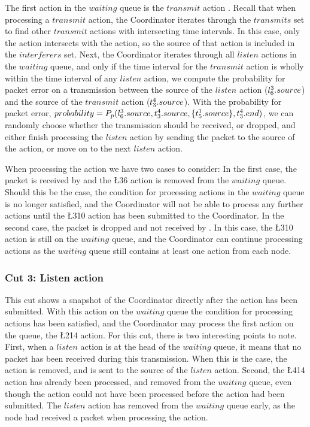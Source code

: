 
The first action in the $waiting$ queue is the $transmit$ action . Recall that when processing a $transmit$ action, the Coordinator iterates through the $transmits$ set to find other $transmit$ actions with intersecting time intervals. In this case, only the  action intersects with the  action, so the source of that action is included in the $interferers$ set. Next, the Coordinator iterates through all $listen$ actions in the $waiting$ queue, and only if the time interval for the $transmit$ action is wholly within the time interval of any $listen$ action, we compute the probability for packet error on a transmission between the source of the $listen$ action ($l^{3}_{6}.source$) and the source of the $transmit$ action ($t^{4}_{3}.source$). With the probability for packet error, $probability = P_p(l^{3}_{6}.source, t^{4}_{3}.source, \{ t^{1}_{5}.source \}, t^{4}_{3}.end)$, we can randomly choose whether the transmission should be received, or dropped, and either finish processing the $listen$ action by sending the packet to the source of the action, or move on to the next $listen$ action. \smallbreak

When processing the  action we have two cases to consider: In the first case, the packet is received by  and the \L{3}{6} action is removed from the $waiting$ queue. Should this be the case, the condition for processing actions in the $waiting$ queue is no longer satisfied, and the Coordinator will not be able to process any further actions until the \L{3}{10} action has been submitted to the Coordinator. In the second case, the packet is dropped and not received by . In this case, the \L{3}{10} action is still on the $waiting$ queue, and the Coordinator can continue processing actions as the $waiting$ queue still contains at least one action from each node.


\subsubsection{Cut 3: Listen action}
This cut shows a snapshot of the Coordinator directly after the  action has been submitted. With this action on the $waiting$ queue the condition for processing actions has been satisfied, and the Coordinator may process the first action on the queue, the \L{2}{14} action. For this cut, there is two interesting points to note. First, when a $listen$ action is at the head of the $waiting$ queue, it means that no packet has been received during this transmission. When this is the case, the action is removed, and \KwNull is sent to the source of the $listen$ action. Second, the \L{4}{14} action has already been processed, and removed from the $waiting$ queue, even though the action could not have been processed before the  action had been submitted. The $listen$ action has removed from the $waiting$ queue early, as the node had received a packet when processing the  action.  \smallbreak

